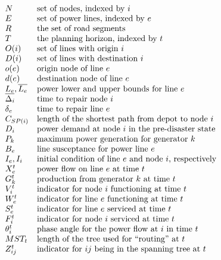\documentclass{article}
\begin{document}
	\begin{displaymath}
	\begin{array}{llll}
	N & \mbox{set of nodes, indexed by $i$} \\
	E & \mbox{set of power lines, indexed by $e$}\\
	R & \mbox{the set of road segments} \\
	T & \mbox{the planning horizon, indexed by $t$}  \\
	O(i) & \mbox{set of lines with origin $i$} \\
	D(i) & \mbox{set of lines with destination $i$} \\
	o(e) & \mbox{origin node of line $e$} \\
	d(e) & \mbox{destination node of line $e$} \\
	\underline{L_e},\overline{L_e} & \mbox{power lower and upper bounds for line $e$}\\
	\Delta_{i} & \mbox{time to repair node $i$} \\
	\delta_{e} & \mbox{time to repair line $e$}\\
	C_{SP(i)} & \mbox{length of the shortest path from depot to node $i$}\\
	D_i & \mbox{power demand at node $i$ in the pre-disaster state}\\
	P_k & \mbox{maximum power generation for generator $k$}\\
	B_e&  \mbox{line susceptance for power line $e$}\\
	I_e, I_i & \mbox{initial condition of line $e$ and node $i$, respectively}\\
	X_{e}^{t} & \mbox{power flow on line $e$ at time $t$}\\
	G_{k}^t & \mbox{production from generator $k$ at time $t$}\\
	V_i^t & \mbox{indicator for node $i$ functioning at time $t$}\\
	W_{e}^t & \mbox{indicator for line $e$ functioning at time $t$}\\
	S_{e}^t & \mbox{indicator for line $e$ serviced at time $t$}\\
	F_i^t & \mbox{indicator for node $i$ serviced at time $t$}\\
	\theta_i^t & \mbox{phase angle for the power flow at $i$ in time $t$}\\
	MST_t & \mbox{length of the tree used for ``routing'' at $t$} \\
	Z_{ij}^t & \mbox{indicator for $ij$ being in the spanning tree at $t$}
	
	\end{array}
	\normalsize
	\end{displaymath}
\end{document}
